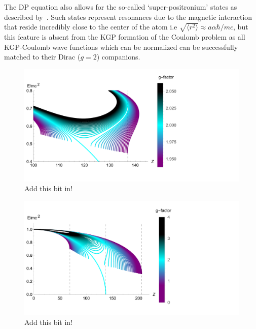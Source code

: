 The DP equation also allows for the so-called `super-positronium' states as described by~\cite{Barut:1975hz,Barut:1976hs}. Such states represent resonances due to the magnetic interaction that reside incredibly close to the center of the atom i.e $\sqrt{\langle r^{2}\rangle}\approx a\alpha\hbar/mc$, but this feature is absent from the KGP formation of the Coulomb problem as all KGP-Coulomb wave functions which can be normalized can be successfully matched to their Dirac ($g\!=\!2$) companions.

\begin{figure}[ht]
    \centering
    \includegraphics[clip, trim=0.0cm 0.0cm 8.0cm 0.0cm,width=0.95\linewidth]{plots/chap02moment/lanplot05.pdf}
     \caption{Add this bit in!}
    \label{fig:gspec1}
\end{figure}

\begin{figure}[ht]
    \centering
    \includegraphics[clip, trim=0.0cm 0.0cm 16.0cm 0.0cm,width=0.95\linewidth]{plots/chap02moment/lanplot06.pdf}
     \caption{Add this bit in!}
    \label{fig:gspec2}
\end{figure}

